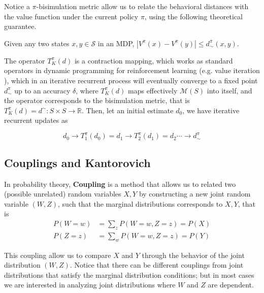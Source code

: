 Notice a $\pi$-bisimulation metric allow us to relate the behavioral distances with the value function under the current policy $\pi$, using the following theoretical guarantee.
\begin{definition}
 Given any two states $x, y \in \mathcal{S}$ in an MDP, $|V^\pi(x) - V^\pi(y)| \leq d^\pi_\sim(x, y)$.   
\end{definition}

The operator $T^\pi_K(d)$ is a contraction mapping, which works as standard operators in dynamic programming for reinforcement learning (e.g. value iteration \cite{sutton1988learning, sutton2018reinforcement}), which in an iterative recurrent process will eventually converge to a fixed point $d^\pi_\sim$ up to an accuracy $\delta$, where $T^\pi_K(d)$ maps effectively $\mathcal{M}(S)$ into itself, and the operator corresponds to the bisimulation metric, that is $T^\pi_K(d) = d^\sim : S \times S \rightarrow \mathbb{R}$. Then, let an initial estimate $d_0$, we have iterative recurrent updates as

$$d_0 \rightarrow T^\pi_1(d_0) = d_1 \rightarrow T^\pi_2(d_1) = d_2 \cdots \rightarrow d^\pi_\sim$$

\subsection{Couplings and Kantorovich}
\label{sec:coupling_kantorovich}

In probability theory, \textbf{Coupling} \cite{lindvall2002lectures} is a method that allows us to related two (possible unrelated) random variables $X, Y$ by constructing a new joint random variable $(W,Z)$, such that the marginal distributions corresponds to $X, Y$, that is
\begin{align}
    P(W = w) & = \sum_z P(W = w, Z = z) = P(X) \\
    P(Z = z) & = \sum_w P(W = w, Z = z) = P(Y)
\end{align}

This coupling allow us to compare $X$ and $Y$ through the behavior of the joint distribution $(W,Z)$. Notice that there can be different couplings from joint distributions that satisfy the marginal distribution conditions; but in most cases we are interested in analyzing joint distributions where $W$ and $Z$ are dependent.

